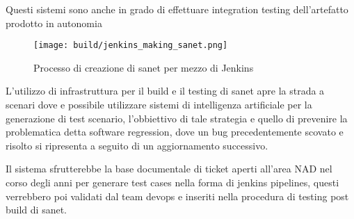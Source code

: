 Questi sistemi sono anche in grado di effettuare integration testing dell'artefatto prodotto in autonomia

\begin{figure}[H]
    \centering
    \texttt{[image: build/jenkins\_making\_sanet.png]}
    \caption{Processo di creazione di sanet per mezzo di Jenkins}
    \label{fig:jenkins_making_sanet}
\end{figure}

L'utilizzo di infrastruttura per il build e il testing di sanet apre la strada a scenari dove e possibile utilizzare sistemi di intelligenza artificiale per la generazione di test scenario, l'obbiettivo di tale strategia e quello di prevenire la problematica detta software regression, dove un bug precedentemente scovato e risolto si ripresenta a seguito di un aggiornamento successivo.

Il sistema sfrutterebbe la base documentale di ticket aperti all'area NAD nel corso degli anni per generare test cases nella forma di jenkins pipelines, questi verrebbero poi validati dal team devops e inseriti nella procedura di testing post build di sanet.
